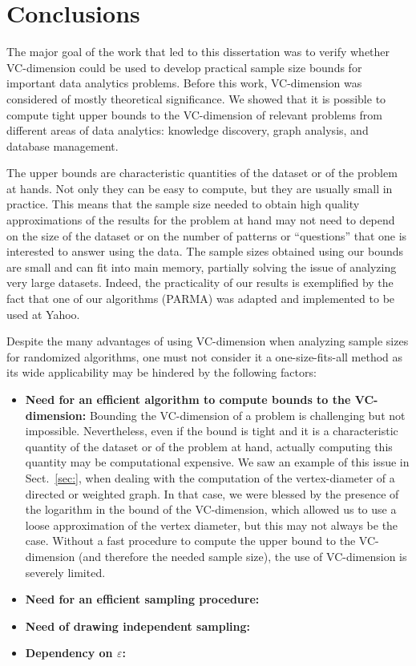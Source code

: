 \chapter{Conclusions}\label{ch:conclusions}

The major goal of the work that led to this dissertation was to verify whether
VC-dimension could be used to develop practical sample size bounds for important
data analytics problems. Before this work, VC-dimension was considered of mostly
theoretical significance. We showed that it is possible to compute tight upper
bounds to the VC-dimension of relevant problems from different areas of data
analytics: knowledge discovery, graph analysis, and database management. 

The upper bounds are characteristic quantities of the dataset or of the
problem at hands. Not only they can be easy to compute, but they are usually
small in practice. This means that the sample size needed to obtain high quality
approximations of the results for the problem at hand may not need to depend on
the size of the dataset or on the number of patterns or ``questions'' that one
is interested to answer using the data. The sample sizes obtained using our
bounds are small and can fit into main memory, partially solving the issue of
analyzing very large datasets. Indeed, the practicality of our results is
exemplified by the fact that one of our algorithms (PARMA) was adapted and
implemented to be used at Yahoo.

Despite the many advantages of using VC-dimension when analyzing sample sizes
for randomized algorithms, one must not consider it a one-size-fits-all method
as its wide applicability may be hindered by the following factors:
\begin{itemize}
  \item{\bf Need for an efficient algorithm to compute bounds to the
    VC-dimension:} Bounding the VC-dimension of a problem is challenging but not
    impossible. Nevertheless, even if the bound is tight and it is a
    characteristic quantity of the dataset or of the problem at hand, actually
    computing this quantity may be computational expensive. We saw an example of
    this issue in Sect.~\ref{sec:}, when dealing with the computation of the
    vertex-diameter of a directed or weighted graph. In that case, we were
    blessed by the presence of the logarithm in the bound of the VC-dimension,
    which allowed us to use a loose approximation of the vertex diameter, but
    this may not always be the case. Without a fast procedure to compute the
    upper bound to the VC-dimension (and therefore the needed sample size), the
    use of VC-dimension is severely limited.
  \item{\bf Need for an efficient sampling procedure:}
  \item{\bf Need of drawing independent sampling:}
  \item{\bf Dependency on $\varepsilon$:} 
\end{itemize}

